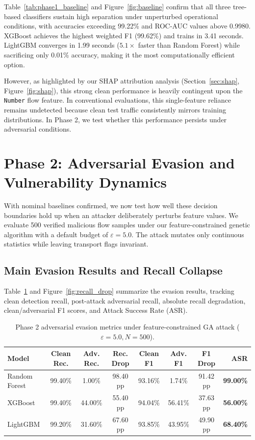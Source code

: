 \documentclass[final,5p,times,twocolumn]{elsarticle}
\begin{document}
Table~\ref{tab:phase1_baseline} and Figure~\ref{fig:baseline} confirm that all three tree-based classifiers sustain high separation under unperturbed operational conditions, with accuracies exceeding 99.22\% and ROC-AUC values above 0.9980. XGBoost achieves the highest weighted F1 (99.62\%) and trains in 3.41 seconds. LightGBM converges in 1.99 seconds ($5.1\times$ faster than Random Forest) while sacrificing only 0.01\% accuracy, making it the most computationally efficient option. 

However, as highlighted by our SHAP attribution analysis (Section~\ref{sec:shap}, Figure~\ref{fig:shap}), this strong clean performance is heavily contingent upon the \texttt{Number} flow feature. In conventional evaluations, this single-feature reliance remains undetected because clean test traffic consistently mirrors training distributions. In Phase 2, we test whether this performance persists under adversarial conditions.

\section{Phase 2: Adversarial Evasion and Vulnerability Dynamics}
\label{sec:phase2}

With nominal baselines confirmed, we now test how well these decision boundaries hold up when an attacker deliberately perturbs feature values. We evaluate 500 verified malicious flow samples under our feature-constrained genetic algorithm with a default budget of $\varepsilon = 5.0$. The attack mutates only continuous statistics while leaving transport flags invariant.

\subsection{Main Evasion Results and Recall Collapse}
Table~\ref{tab:phase2_evasion} and Figure~\ref{fig:recall_drop} summarize the evasion results, tracking clean detection recall, post-attack adversarial recall, absolute recall degradation, clean/adversarial F1 scores, and Attack Success Rate (ASR).

\begin{table}[htbp]
\centering
\caption{Phase 2 adversarial evasion metrics under feature-constrained GA attack ($\varepsilon = 5.0, N=500$).}
\label{tab:phase2_evasion}
\begin{tabular}{lccccccr}
\toprule
\textbf{Model} & \textbf{Clean Rec.} & \textbf{Adv. Rec.} & \textbf{Rec. Drop} & \textbf{Clean F1} & \textbf{Adv. F1} & \textbf{F1 Drop} & \textbf{ASR} \\
\midrule
Random Forest & 99.40\% & 1.00\%  & 98.40 pp & 93.16\% & 1.74\%  & 91.42 pp & \textbf{99.00\%} \\
XGBoost       & 99.40\% & 44.00\% & 55.40 pp & 94.04\% & 56.41\% & 37.63 pp & \textbf{56.00\%} \\
LightGBM      & 99.20\% & 31.60\% & 67.60 pp & 93.85\% & 43.95\% & 49.90 pp & \textbf{68.40\%} \\
\bottomrule
\end{tabular}
\end{table}
\end{document}
